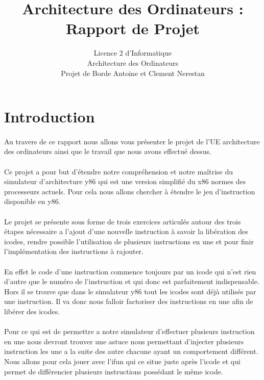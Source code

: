 \documentclass[12pt]{article}
\title{Architecture des Ordinateurs : Rapport de Projet}
\author{Licence 2 d'Informatique\\ 
  Architecture des Ordinateurs\\
  Projet de Borde Antoine et Clement Nerestan}
\begin{document}
\maketitle

\newpage

\tableofcontents

\newpage

\section*{Introduction}

\paragraph{} Au travers de ce rapport nous allons vous présenter le projet
 de l'UE architecture des ordinateurs ainsi que le travail que nous avons 
 effectué dessus.

\paragraph{} Ce projet a pour but d'étendre notre compréhension et notre 
maîtrise du simulateur d'architecture y86 qui est une version simplifié
du x86 normes des processeurs actuels. Pour cela nous allons chercher à 
étendre le jeu d'instruction disponible en y86.

\paragraph{} Le projet se présente sous forme de trois exercices
articulés autour des trois étapes
nécessaire a l'ajout d'une nouvelle instruction à savoir la libération
des icodes, rendre possible l'utilisation de plusieurs instructions en
une et pour finir l’implémentation des instructions à rajouter.

\paragraph{} En effet le code d'une instruction commence toujours par un
 icode qui n'est rien d'autre que le numéro de l'instruction et qui
 donc est parfaitement indispensable. Hors il se trouve que dans le simulateur
 y86 tout les icodes sont déjà utilisés par une instruction. Il va donc nous
 falloir factoriser des instructions en une afin de libérer des icodes.

\paragraph{} Pour ce qui est de permettre a notre simulateur d’effectuer
plusieurs instruction en une nous devront trouver une astuce nous permettant
d'injecter plusieurs instruction les une a la suite des autre chacune ayant un
comportement différent. Nous allons pour cela jouer avec l'ifun qui ce situe
juste après l'icode et qui permet de différencier plusieurs instructions possédant le même icode.
\end{document}
